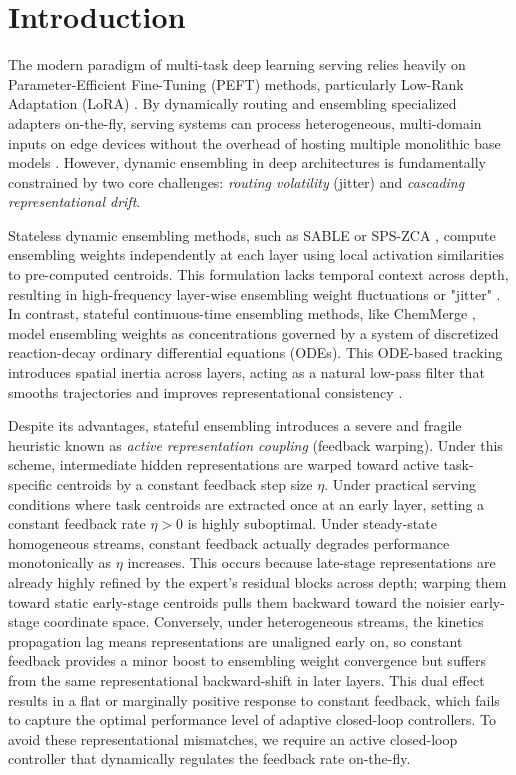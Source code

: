 \section{Introduction}
\label{sec:intro}

The modern paradigm of multi-task deep learning serving relies heavily on Parameter-Efficient Fine-Tuning (PEFT) methods, particularly Low-Rank Adaptation (LoRA) \cite{hu2021lora}. By dynamically routing and ensembling specialized adapters on-the-fly, serving systems can process heterogeneous, multi-domain inputs on edge devices without the overhead of hosting multiple monolithic base models \cite{pfeiffer2020adapterhub, wortsman2022model}. However, dynamic ensembling in deep architectures is fundamentally constrained by two core challenges: \emph{routing volatility} (jitter) and \emph{cascading representational drift}.

Stateless dynamic ensembling methods, such as SABLE \cite{sable2025} or SPS-ZCA \cite{spszca2025}, compute ensembling weights independently at each layer using local activation similarities to pre-computed centroids. This formulation lacks temporal context across depth, resulting in high-frequency layer-wise ensembling weight fluctuations or "jitter" \cite{chemmerge2025}. In contrast, stateful continuous-time ensembling methods, like ChemMerge \cite{chemmerge2025}, model ensembling weights as concentrations governed by a system of discretized reaction-decay ordinary differential equations (ODEs). This ODE-based tracking introduces spatial inertia across layers, acting as a natural low-pass filter that smooths trajectories and improves representational consistency \cite{chen2018neural, haber2017stable}.

Despite its advantages, stateful ensembling introduces a severe and fragile heuristic known as \emph{active representation coupling} (feedback warping). Under this scheme, intermediate hidden representations are warped toward active task-specific centroids by a constant feedback step size $\eta$. Under practical serving conditions where task centroids are extracted once at an early layer, setting a constant feedback rate $\eta > 0$ is highly suboptimal. Under steady-state homogeneous streams, constant feedback actually degrades performance monotonically as $\eta$ increases. This occurs because late-stage representations are already highly refined by the expert's residual blocks across depth; warping them toward static early-stage centroids pulls them backward toward the noisier early-stage coordinate space. Conversely, under heterogeneous streams, the kinetics propagation lag means representations are unaligned early on, so constant feedback provides a minor boost to ensembling weight convergence but suffers from the same representational backward-shift in later layers. This dual effect results in a flat or marginally positive response to constant feedback, which fails to capture the optimal performance level of adaptive closed-loop controllers. To avoid these representational mismatches, we require an active closed-loop controller that dynamically regulates the feedback rate on-the-fly.

